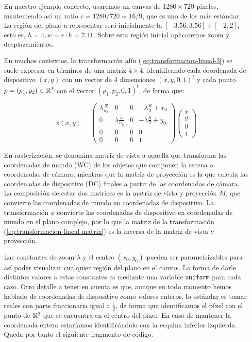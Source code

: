 En nuestro ejemplo concreto, usaremos un canvas de $1280\times 720$ píxeles, manteniendo así un ratio $r=1280/720=16/9$, que es uno de los más estándar. La región del plano a representar será inicialmente la $[-3.56,3.56]\times[-2,2]$, esto es, $h=4, w=r\cdot h =7.11$. Sobre esta región inicial aplicaremos zoom y desplazamientos.

En muchos contextos, la transformación afín (\ref{eq:transformacion-lineal-3}) se suele expresar en términos de una matriz $4\times 4$, identificando cada coordenada de dispositivo $(x,y)$ con un vector de 4 dimensiones $(x,y,0,1)^t$ y cada punto $p=(p_1,p_2)\in\mathbb{R}^2$ con el vector $(p_1, p_2, 0 ,1)^t$, de forma que:

\begin{equation}
    \label{eq:transformacion-lineal-matrix}
    \phi(x,y)=\left(\begin{array}{ccc|c}
        \lambda\frac{w}{n_x} & 0 & 0 & -\lambda\frac{w}{2}+x_0 \\

        0 & \lambda\frac{h}{n_y} & 0 & -\lambda\frac{h}{2}+y_0 \\
        0 & 0 & 0 & 0 \\ \hline
        0 & 0 & 0 & 1
    \end{array}\right)\left(
    \begin{array}{c}
        x \\ y \\ 0 \\ \hline 1
    \end{array}\right)
\end{equation}

En rasterización, se denomina matriz de vista a aquella que transforma las coordenadas de mundo (WC) de los objetos que componen la escena a coordenadas de cámara, mientras que la matriz de proyección es la que calcula las coordenadas de dispositivo (DC) finales a partir de las coordenadas de cámara. La composición de estas dos matrices es la matriz de vista y proyección $M$, que convierte las coordenadas de mundo en coordenadas de dispositivo. La transformación $\phi$ convierte las coordenadas de dispositivo en coordenadas de mundo en el plano complejo, por lo que la matriz de la transformación (\ref{eq:transformacion-lineal-matrix}) es la inversa de la matriz de vista y proyección.


Las constantes de zoom $\lambda$ y el centro $(x_0,y_0)$ pueden ser parametrizables para así poder visualizar cualquier región del plano en el canvas. La forma de darle distintos valores a estas constantes es mediante una variable \verb|uniform| para cada caso. Otro detalle a tener en cuenta es que, aunque en todo momento hemos hablado de coordenadas de dispositivo como valores enteros, lo estándar es tomar reales con parte fraccionaria igual a $\frac{1}{2}$, de forma que identificamos el píxel con el punto de $\mathbb{R}^2$ que se encuentra en el centro del píxel. En caso de mantener la coordenada entera estaríamos identificándolo con la esquina inferior izquierda. Queda por tanto el siguiente fragmento de código:

